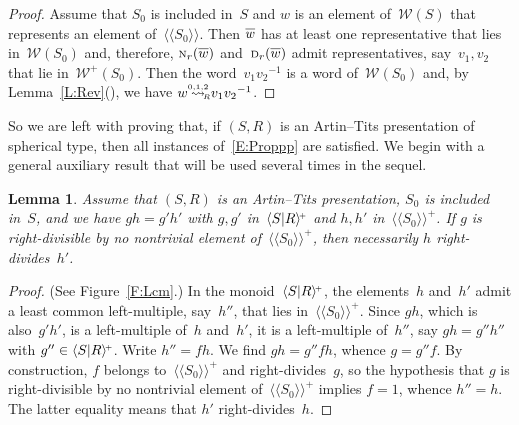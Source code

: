 \documentclass{amsart}
\numberwithin{equation}{section}
\theoremstyle{plain}
\newtheorem{lemm}[prop]{Lemma}
\theoremstyle{definition}
\newcounter{ITEM}
\begin{document}
\begin{proof}
Assume that ${S}_0$ is included in~${S}$ and ${w}$ is an element of~${\mathcal{W}({S})}$ that represents an element of~${\langle\!\langle{{{S}_0}}\rangle\!\rangle}$. Then ${\overline{\vrule width0pt height5pt{w}}}$ has at least one representative that lies in~${\mathcal{W}({{S}_0})}$ and, therefore, ${{\scriptstyle\mathrm{N}}{_{r}}({{\overline{\vrule width0pt height5pt{w}}}})}$ and~${{\scriptstyle\mathrm{D}}{_{r}}({{\overline{\vrule width0pt height5pt{w}}}})}$ admit representatives, say~${v}_1, {v}_2$ that lie in~${\mathcal{W}^{\scriptscriptstyle+}\!({{S}_0})}$. Then the word~${v}_1 {v}_2{^{-1}}$ is a word of~${\mathcal{W}({{S}_0})}$ and, by Lemma~\ref{L:Rev}{\setcounter{ITEM}{2}\leavevmode\hbox{\rm()}}, we have ${w} {\mathrel{{\mathrel{\overset{\scriptscriptstyle 0,1,2}{\rightsquigarrow}}}_{\hspace{-0.9ex}{\scriptscriptstyle R}}}} {v}_1 {v}_2{^{-1}}$.
\end{proof}

So we are left with proving that, if $({S}, {R})$ is an Artin--Tits presentation of spherical type, then all instances of~\eqref{E:Proppp} are satisfied. We begin with a general auxiliary result that will be used several times in the sequel.

\begin{lemm}
\label{L:Lcm}
Assume that $({S}, {R})$ is an Artin--Tits presentation, ${S}_0$ is included in~${S}$, and we have ${g} {h} = {g}' {h}'$ with ${g}, {g}'$ in~${\langle{S}{\mid}\nobreak{R}\rangle^{\!\scriptscriptstyle+}}$ and ${h}, {h}'$ in~${\langle\!\langle{{{S}_0}}\rangle\!\rangle^{\!\scriptscriptstyle+}}$. If ${g}$ is right-divisible by no nontrivial element of~${\langle\!\langle{{{S}_0}}\rangle\!\rangle^{\!\scriptscriptstyle+}}$, then necessarily ${h}$ right-divides~${h}'$.
\end{lemm}

\begin{proof}
(See Figure~\ref{F:Lcm}.) In the monoid~${\langle{S}{\mid}\nobreak{R}\rangle^{\!\scriptscriptstyle+}}$, the elements~${h}$ and~${h}'$ admit a least common left-multiple, say~${h}''$, that lies in~${\langle\!\langle{{{S}_0}}\rangle\!\rangle^{\!\scriptscriptstyle+}}$. Since ${g} {h}$, which is also~${g}' {h}'$, is a left-multiple of~${h}$ and~${h}'$, it is a left-multiple of~${h}''$, say ${g} {h} = {g}'' {h}''$ with ${g}'' \in {\langle{S}{\mid}\nobreak{R}\rangle^{\!\scriptscriptstyle+}}$. Write ${h}'' = {f} {h}$. We find ${g} {h} = {g}'' {f} {h}$, whence ${g} = {g}'' {f}$. By construction, ${f}$ belongs to~${\langle\!\langle{{{S}_0}}\rangle\!\rangle^{\!\scriptscriptstyle+}}$ and right-divides~${g}$, so the hypothesis that ${g}$ is right-divisible by no nontrivial element of~${\langle\!\langle{{{S}_0}}\rangle\!\rangle^{\!\scriptscriptstyle+}}$ implies ${f} = 1$, whence ${h}'' = {h}$. The latter equality means that ${h}'$ right-divides~${h}$. 
\end{proof}
\end{document}
